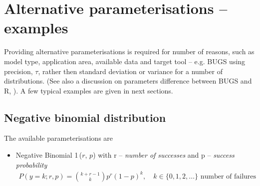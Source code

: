 {%
%
%

\section{Alternative parameterisations -- examples}
Providing alternative parameterisations is required for number of reasons, such as
model type, application area, available data and target tool -- e.g. BUGS using 
precision, $\tau$, rather then standard deviation or variance for a number of 
distributions. (See also a discussion on parameters difference between BUGS
and R, \cite{lebauer2013translating}). A few typical examples are given in next sections.

\subsection{Negative binomial distribution} 
The available parameterisations are
\begin{itemize}
\item
Negative Binomial 1\,($r$, $p$) with r -- \emph{number of successes} and p -- \emph{success probability}
\begin{align}
P(y=k;r,p) = \binom {k+r-1}k p^r (1-p)^k, \quad k\in \{0,1,2,\dots \} \text{ number of failures} \nonumber
\end{align}


\end{itemize}}
